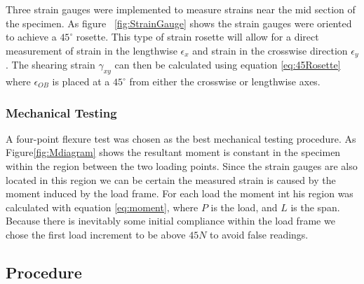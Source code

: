 \documentclass[12pt]{article}
\begin{document}
Three strain gauges were implemented to measure strains near the mid section of the specimen. As figure ~\ref{fig:StrainGauge} shows the strain gauges were oriented to achieve a $45^{\circ}$ rosette. This type of strain rosette  will allow for a direct measurement of strain in the lengthwise $\epsilon_{x} $ and strain in the crosswise direction $\epsilon_{y}$.  The shearing strain $\gamma_{xy}$ can then be calculated using equation \ref{eq:45Rosette} where $\epsilon_{OB} $ is placed at a $45^{\circ} $ from either the crosswise or lengthwise axes.

\subsubsection{Mechanical Testing}
A four-point flexure test was chosen as  the best mechanical testing procedure.   As Figure\ref{fig:Mdiagram}  shows the resultant moment is constant in the specimen within the region between the two loading points.  Since the strain gauges are also located in this region we can be certain the measured strain is caused by the moment induced by the load frame. For each load the moment int his region  was calculated with equation \ref{eq:moment}, where $P$ is the load, and $L$ is the span.  Because there is inevitably some initial compliance within the load frame  we chose the first load increment to be above $45N$ to avoid false readings.  

\subsection{Procedure} %
\end{document}
